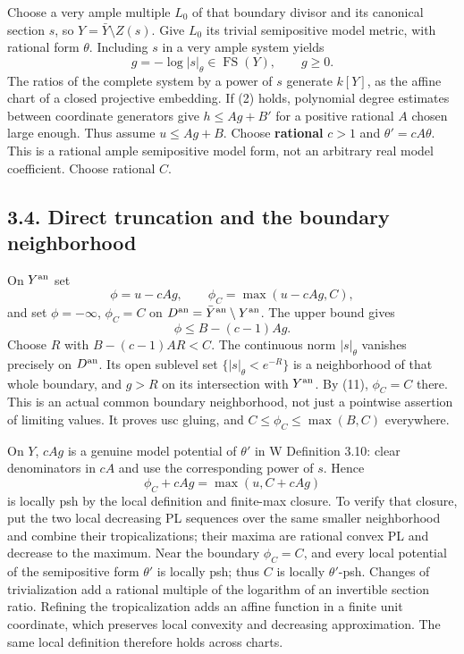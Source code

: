\documentclass[
  11pt,
]{article}
\begin{document}
Choose a very ample multiple \(L_0\) of that boundary divisor and its
canonical section \(s\), so \(Y=\bar Y\setminus Z(s)\). Give \(L_0\) its
trivial semipositive model metric, with rational form \(\theta\).
Including \(s\) in a very ample system yields
\[g=-\log|s|_\theta\in\operatorname{FS}(Y),\qquad g\geq0.\] The ratios
of the complete system by a power of \(s\) generate \(k[Y]\), as the
affine chart of a closed projective embedding. If (2) holds, polynomial
degree estimates between coordinate generators give \(h\leq A g+B'\) for
a positive rational \(A\) chosen large enough. Thus assume
\(u\leq Ag+B\). Choose \textbf{rational} \(c>1\) and
\(\theta'=cA\theta\). This is a rational ample semipositive model form,
not an arbitrary real model coefficient. Choose rational \(C\).

\subsection{3.4. Direct truncation and the boundary
neighborhood}\label{direct-truncation-and-the-boundary-neighborhood}

On \(Y^{\rm an}\) set \[\phi=u-cAg,\qquad\phi_C=\max(u-cAg,C),\] and set
\(\phi=-\infty\), \(\phi_C=C\) on
\(D^{\rm an}=\bar Y^{\rm an}\setminus Y^{\rm an}\). The upper bound
gives \[\phi\leq B-(c-1)Ag.\tag{11}\] Choose \(R\) with \(B-(c-1)AR<C\).
The continuous norm \(|s|_\theta\) vanishes precisely on \(D^{\rm an}\).
Its open sublevel set \(\{|s|_\theta<e^{-R}\}\) is a neighborhood of
that whole boundary, and \(g>R\) on its intersection with
\(Y^{\rm an}\). By (11), \(\phi_C=C\) there. This is an actual common
boundary neighborhood, not just a pointwise assertion of limiting
values. It proves usc gluing, and \(C\leq\phi_C\leq\max(B,C)\)
everywhere.

On \(Y\), \(cAg\) is a genuine model potential of \(\theta'\) in W
Definition 3.10: clear denominators in \(cA\) and use the corresponding
power of \(s\). Hence \[\phi_C+cAg=\max(u,C+cAg)\] is locally psh by the
local definition and finite-max closure. To verify that closure, put the
two local decreasing PL sequences over the same smaller neighborhood and
combine their tropicalizations; their maxima are rational convex PL and
decrease to the maximum. Near the boundary \(\phi_C=C\), and every local
potential of the semipositive form \(\theta'\) is locally psh; thus
\(C\) is locally \(\theta'\)-psh. Changes of trivialization add a
rational multiple of the logarithm of an invertible section ratio.
Refining the tropicalization adds an affine function in a finite unit
coordinate, which preserves local convexity and decreasing
approximation. The same local definition therefore holds across charts.
\end{document}
